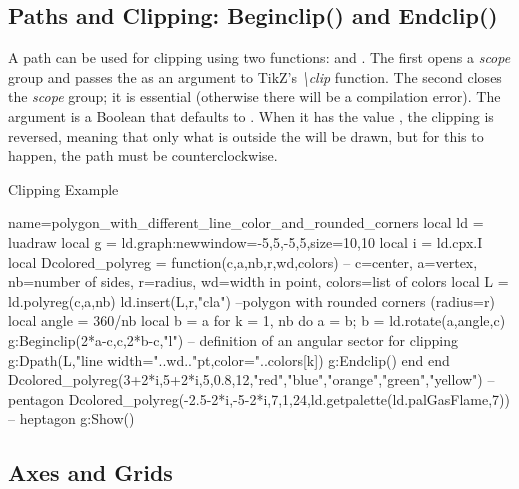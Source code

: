 \subsection{Paths and Clipping: Beginclip() and Endclip()}

A path can be used for clipping using two functions:  and . The first opens a \emph{scope} group and passes the  as an argument to TikZ's \emph{\textbackslash clip} function. The second closes the \emph{scope} group; it is essential (otherwise there will be a compilation error).
The  argument is a Boolean that defaults to \false. When it has the value \true, the clipping is reversed, meaning that only what is outside the  will be drawn, but for this to happen, the path must be counterclockwise.

\begin{demo}{Clipping Example}
\begin{luadraw}{name=polygon_with_different_line_color_and_rounded_corners}
local ld = luadraw
local g = ld.graph:new{window={-5,5,-5,5},size={10,10}}
local i = ld.cpx.I
local Dcolored_polyreg = function(c,a,nb,r,wd,colors)
-- c=center, a=vertex, nb=number of sides, r=radius, wd=width in point, colors=list of colors
    local L = ld.polyreg(c,a,nb)
    ld.insert(L,{r,"cla"}) --polygon with rounded corners (radius=r)
    local angle = 360/nb
    local b = a
    for k = 1, nb do
        a = b; b = ld.rotate(a,angle,c)
        g:Beginclip({2*a-c,c,2*b-c,"l"}) -- definition of an angular sector for clipping
        g:Dpath(L,"line width="..wd.."pt,color="..colors[k])
        g:Endclip()
    end
end
Dcolored_polyreg(3+2*i,5+2*i,5,0.8,12,{"red","blue","orange","green","yellow"}) -- pentagon
Dcolored_polyreg(-2.5-2*i,-5-2*i,7,1,24,ld.getpalette(ld.palGasFlame,7)) -- heptagon
g:Show()
\end{luadraw}
\end{demo}


\subsection{Axes and Grids}

